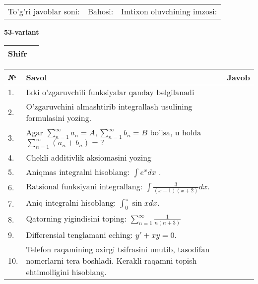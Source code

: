 \documentclass{article}
\begin{document}
  \vspace{1cm}
  
  \begin{tabular}{lll}
  To'g'ri javoblar soni: \underline{\hspace{1.5cm}} & 
  Bahosi: \underline{\hspace{1.5cm}} & 
  Imtixon oluvchining imzosi: \underline{\hspace{2cm}} \\
  \end{tabular}
  
  \egroup
  
  \newpage
  
  
  \textbf{53-variant}\\
  
  \bgroup
  \def\arraystretch{1.6} %
  
  \begin{tabular}{|m{5.7cm}|m{9.5cm}|}
  \hline
  Shifr & \\
  \hline
  \end{tabular}
  
  \vspace{1cm}
  
  \begin{tabular}{|m{0.7cm}|m{10cm}|m{4cm}|}
  \hline
  № & Savol & Javob \\
  \hline
  1. & Ikki o'zgaruvchili funksiyalar qanday belgilanadi &  \\
  \hline
  2. & O'zgaruvchini almashtirib integrallash usulining formulasini yozing. &  \\
  \hline
  3. & Agar \(\sum_{n = 1}^{\infty}a_{n} = A,\sum_{n = 1}^{\infty}b_{n} = B\) bo'lsa, u holda \(\sum_{n = 1}^{\infty}\left( a_{n} + b_{n} \right) = ?\) &  \\
  \hline
  4. & Chekli additivlik aksiomasini yozing &  \\
  \hline
  5. & Aniqmas integralni hisoblang: \(\int {e^{x}dx}\) . &  \\
  \hline
  6. & Ratsional funksiyani integrallang: \(\int {\frac{3}{(x - 1)(x + 2)}dx}\). &  \\
  \hline
  7. & Aniq integralni hisoblang: \(\int_{0}^{\pi}{\sin xdx}\). &  \\
  \hline
  8. & Qatorning yigindisini toping: \(\sum_{n = 1}^{\infty}\frac{1}{n(n + 3)}\) &  \\
  \hline
  9. & Differensial tenglamani eching: \(y' + xy = 0\). &  \\
  \hline
  10. & Telefon raqamining oxirgi tsifrasini unutib, tasodifan nomerlarni tera boshladi. Kerakli raqamni topish ehtimolligini hisoblang. &  \\
  \hline
  \end{tabular}
  
\end{document}
